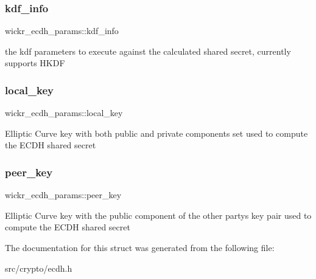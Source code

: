 \subsubsection{\texorpdfstring{kdf\+\_\+info}{kdf\_info}}
{\footnotesize\ttfamily wickr\+\_\+ecdh\+\_\+params\+::kdf\+\_\+info}

the kdf parameters to execute against the calculated shared secret, currently supports H\+K\+DF \mbox{\label{structwickr__ecdh__params_aab5a55e6a516ab8268ef6739ae1422cd}} 
\subsubsection{\texorpdfstring{local\+\_\+key}{local\_key}}
{\footnotesize\ttfamily wickr\+\_\+ecdh\+\_\+params\+::local\+\_\+key}

Elliptic Curve key with both public and private components set used to compute the E\+C\+DH shared secret \mbox{\label{structwickr__ecdh__params_ab17d6191b23fa7fd1befd03b2eee4ba9}} 
\subsubsection{\texorpdfstring{peer\+\_\+key}{peer\_key}}
{\footnotesize\ttfamily wickr\+\_\+ecdh\+\_\+params\+::peer\+\_\+key}

Elliptic Curve key with the public component of the other party\textquotesingle{}s key pair used to compute the E\+C\+DH shared secret 

The documentation for this struct was generated from the following file\+:\begin{DoxyCompactItemize}
\item 
src/crypto/ecdh.\+h\end{DoxyCompactItemize}
